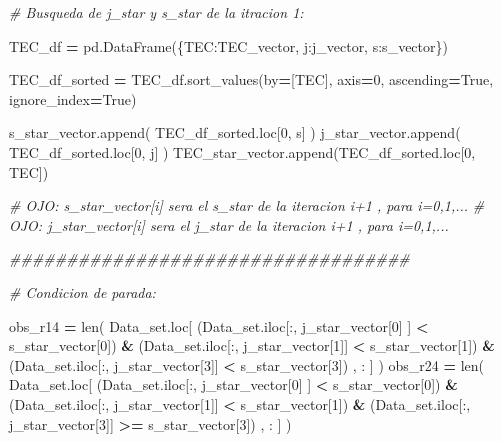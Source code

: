 \documentclass[
  11pt,
  a4paper,
]{article}
\newenvironment{Shaded}{\begin{snugshade}}{\end{snugshade}}
\newcommand{\BuiltInTok}[1]{#1}
\newcommand{\CommentTok}[1]{\textcolor[rgb]{0.56,0.35,0.01}{\textit{#1}}}
\newcommand{\DecValTok}[1]{\textcolor[rgb]{0.00,0.00,0.81}{#1}}
\newcommand{\NormalTok}[1]{#1}
\newcommand{\OperatorTok}[1]{\textcolor[rgb]{0.81,0.36,0.00}{\textbf{#1}}}
\newcommand{\StringTok}[1]{\textcolor[rgb]{0.31,0.60,0.02}{#1}}
\newcommand{\VariableTok}[1]{\textcolor[rgb]{0.00,0.00,0.00}{#1}}
\begin{document}
\begin{Shaded}
\begin{Highlighting}[]
        \CommentTok{\# Busqueda de j\_star y s\_star de la itracion 1:}

\NormalTok{        TEC\_df }\OperatorTok{=}\NormalTok{ pd.DataFrame(\{}\StringTok{\textquotesingle{}TEC\textquotesingle{}}\NormalTok{:TEC\_vector, }\StringTok{\textquotesingle{}j\textquotesingle{}}\NormalTok{:j\_vector, }\StringTok{\textquotesingle{}s\textquotesingle{}}\NormalTok{:s\_vector\})}

\NormalTok{        TEC\_df\_sorted }\OperatorTok{=}\NormalTok{ TEC\_df.sort\_values(by}\OperatorTok{=}\NormalTok{[}\StringTok{\textquotesingle{}TEC\textquotesingle{}}\NormalTok{], axis}\OperatorTok{=}\DecValTok{0}\NormalTok{, ascending}\OperatorTok{=}\VariableTok{True}\NormalTok{, ignore\_index}\OperatorTok{=}\VariableTok{True}\NormalTok{)}

\NormalTok{        s\_star\_vector.append( TEC\_df\_sorted.loc[}\DecValTok{0}\NormalTok{, }\StringTok{\textquotesingle{}s\textquotesingle{}}\NormalTok{] )}
\NormalTok{        j\_star\_vector.append( TEC\_df\_sorted.loc[}\DecValTok{0}\NormalTok{, }\StringTok{\textquotesingle{}j\textquotesingle{}}\NormalTok{] )}
\NormalTok{        TEC\_star\_vector.append(TEC\_df\_sorted.loc[}\DecValTok{0}\NormalTok{, }\StringTok{\textquotesingle{}TEC\textquotesingle{}}\NormalTok{])}

        \CommentTok{\# OJO: s\_star\_vector[i] sera el s\_star de la iteracion i+1 , para i=0,1,...}
        \CommentTok{\# OJO: j\_star\_vector[i] sera el j\_star de la iteracion i+1 , para i=0,1,...        }


      \CommentTok{\#\#\#\#\#\#\#\#\#\#\#\#\#\#\#\#\#\#\#\#\#\#\#\#\#\#\#\#\#\#\#\#\#\#\#}

        \CommentTok{\# Condicion de parada:}

\NormalTok{        obs\_r14 }\OperatorTok{=} \BuiltInTok{len}\NormalTok{( Data\_set.loc[ (Data\_set.iloc[:, j\_star\_vector[}\DecValTok{0}\NormalTok{] ] }\OperatorTok{\textless{}}\NormalTok{ s\_star\_vector[}\DecValTok{0}\NormalTok{]) }\OperatorTok{\&}\NormalTok{ (Data\_set.iloc[:, j\_star\_vector[}\DecValTok{1}\NormalTok{]] }\OperatorTok{\textless{}}\NormalTok{ s\_star\_vector[}\DecValTok{1}\NormalTok{]) }\OperatorTok{\&}\NormalTok{ (Data\_set.iloc[:, j\_star\_vector[}\DecValTok{3}\NormalTok{]] }\OperatorTok{\textless{}}\NormalTok{ s\_star\_vector[}\DecValTok{3}\NormalTok{]) , : ] )}
\NormalTok{        obs\_r24 }\OperatorTok{=} \BuiltInTok{len}\NormalTok{( Data\_set.loc[ (Data\_set.iloc[:, j\_star\_vector[}\DecValTok{0}\NormalTok{] ] }\OperatorTok{\textless{}}\NormalTok{ s\_star\_vector[}\DecValTok{0}\NormalTok{]) }\OperatorTok{\&}\NormalTok{ (Data\_set.iloc[:, j\_star\_vector[}\DecValTok{1}\NormalTok{]] }\OperatorTok{\textless{}}\NormalTok{ s\_star\_vector[}\DecValTok{1}\NormalTok{]) }\OperatorTok{\&}\NormalTok{ (Data\_set.iloc[:, j\_star\_vector[}\DecValTok{3}\NormalTok{]] }\OperatorTok{\textgreater{}=}\NormalTok{ s\_star\_vector[}\DecValTok{3}\NormalTok{]) , : ] )}


\end{Highlighting}
\end{Shaded}
\end{document}
